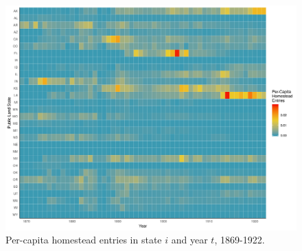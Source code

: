 \documentclass[12pt]{article}
\begin{document}

\begin{figure}[htbp]
	\begin{center}
		\includegraphics[width=\textwidth]{plots/homestead-heatmap.png}
	\end{center}
	\caption{Per-capita homestead entries in state $i$ and year $t$, 1869-1922. \label{fig:homestead-heatmap}}
\end{figure}
\end{document}
